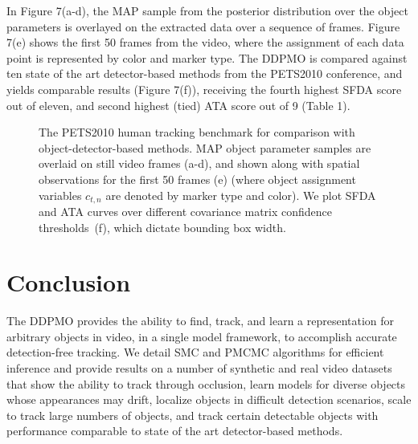 \documentclass{article}
\begin{document}
In Figure 7(a-d), the MAP sample from the posterior distribution over the object parameters is overlayed on the extracted data over a sequence of frames. Figure 7(e) shows the first 50 frames from the video, where the assignment of each data point is represented by color and marker type. The DDPMO is compared against ten state of the art detector-based methods from the PETS2010 conference, and yields comparable results (Figure 7(f)), receiving the fourth highest SFDA score out of eleven, and second highest (tied) ATA score out of 9 (Table 1).
\begin{figure}[h!tbp]
        \caption{\label{fig:pets2009Fig} The PETS2010 human tracking benchmark for comparison with object-detector-based methods. MAP object parameter samples are overlaid on still video frames (a-d), and shown along with spatial observations for the first 50 frames (e) (where object assignment variables $c_{t,n}$ are denoted by marker type and color). We plot SFDA and ATA curves over different covariance matrix confidence thresholds~(f), which dictate bounding box width. }
\end{figure}

\vspace{-2mm}
\section{Conclusion}
The DDPMO provides the ability to find, track, and learn a representation for arbitrary objects in video, in a single model framework, to accomplish accurate detection-free tracking.
We detail SMC and PMCMC algorithms for efficient inference and provide results on a number of synthetic and real video datasets that show the ability to track through occlusion, learn models for diverse objects whose appearances may drift, localize objects in difficult detection scenarios, scale to track large numbers of objects, and track certain detectable objects with performance comparable to state of the art detector-based methods.


\begin{small}


\end{small}
\end{document}
